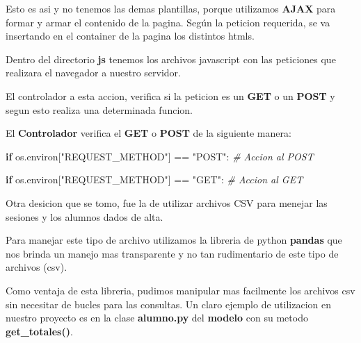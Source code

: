 \documentclass[12pt]{extarticle}
\newenvironment{Shaded}{}{}
\newcommand{\StringTok}[1]{\textcolor[rgb]{0.25,0.44,0.63}{{#1}}}
\newcommand{\CommentTok}[1]{\textcolor[rgb]{0.38,0.63,0.69}{\textit{{#1}}}}
\newcommand{\NormalTok}[1]{{#1}}
\newcommand{\ControlFlowTok}[1]{\textcolor[rgb]{0.00,0.44,0.13}{\textbf{{#1}}}}
\newcommand{\OperatorTok}[1]{\textcolor[rgb]{0.40,0.40,0.40}{{#1}}}
\begin{document}
Esto es asi y no tenemos las demas plantillas, porque utilizamos
\textbf{AJAX} para formar y armar el contenido de la pagina. Según la
peticion requerida, se va insertando en el container de la pagina los
distintos htmls.

Dentro del directorio \textbf{js} tenemos los archivos javascript con
las peticiones que realizara el navegador a nuestro servidor.

El controlador a esta accion, verifica si la peticion es un \textbf{GET}
o un \textbf{POST} y segun esto realiza una determinada funcion.

El \textbf{Controlador} verifica el \textbf{GET} o \textbf{POST} de la
siguiente manera:

\begin{Shaded}
\begin{Highlighting}[]
\ControlFlowTok{if}\NormalTok{ os.environ[}\StringTok{"REQUEST_METHOD"}\NormalTok{] }\OperatorTok{==} \StringTok{"POST"}\NormalTok{:}
    \CommentTok{# Accion al POST}

\ControlFlowTok{if}\NormalTok{ os.environ[}\StringTok{"REQUEST_METHOD"}\NormalTok{] }\OperatorTok{==} \StringTok{"GET"}\NormalTok{:}
    \CommentTok{# Accion al GET}
\end{Highlighting}
\end{Shaded}

Otra desicion que se tomo, fue la de utilizar archivos CSV para menejar
las sesiones y los alumnos dados de alta.

Para manejar este tipo de archivo utilizamos la libreria de python
\textbf{pandas} que nos brinda un manejo mas transparente y no tan
rudimentario de este tipo de archivos (csv).

Como ventaja de esta libreria, pudimos manipular mas facilmente los
archivos csv sin necesitar de bucles para las consultas. Un claro
ejemplo de utilizacion en nuestro proyecto es en la clase
\textbf{alumno.py} del \textbf{modelo} con su metodo
\textbf{get\_totales()}.
\end{document}
